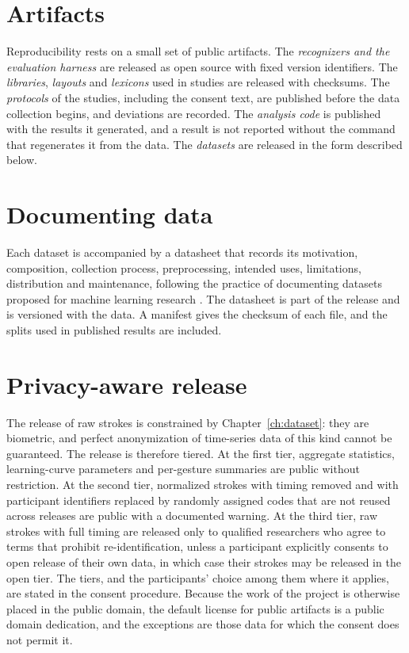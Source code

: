 \section{Artifacts}

Reproducibility rests on a small set of public artifacts. The \emph{recognizers and the evaluation harness} are released as open source with fixed version identifiers. The \emph{libraries}, \emph{layouts} and \emph{lexicons} used in studies are released with checksums. The \emph{protocols} of the studies, including the consent text, are published before the data collection begins, and deviations are recorded. The \emph{analysis code} is published with the results it generated, and a result is not reported without the command that regenerates it from the data. The \emph{datasets} are released in the form described below.

\section{Documenting data}

Each dataset is accompanied by a datasheet that records its motivation, composition, collection process, preprocessing, intended uses, limitations, distribution and maintenance, following the practice of documenting datasets proposed for machine learning research \cite{gebru2021}.\evD{} The datasheet is part of the release and is versioned with the data. A manifest gives the checksum of each file, and the splits used in published results are included.

\section{Privacy-aware release}

The release of raw strokes is constrained by Chapter~\ref{ch:dataset}: they are biometric, and perfect anonymization of time-series data of this kind cannot be guaranteed. The release is therefore tiered. At the first tier, aggregate statistics, learning-curve parameters and per-gesture summaries are public without restriction. At the second tier, normalized strokes with timing removed and with participant identifiers replaced by randomly assigned codes that are not reused across releases are public with a documented warning. At the third tier, raw strokes with full timing are released only to qualified researchers who agree to terms that prohibit re-identification, unless a participant explicitly consents to open release of their own data, in which case their strokes may be released in the open tier. The tiers, and the participants' choice among them where it applies, are stated in the consent procedure. Because the work of the project is otherwise placed in the public domain, the default license for public artifacts is a public domain dedication, and the exceptions are those data for which the consent does not permit it.\evS
